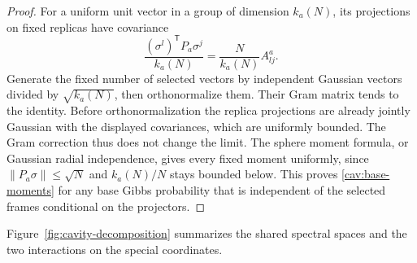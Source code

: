 \begin{proof}
For a uniform unit vector in a group of dimension $k_a(N)$, its
projections on fixed replicas have covariance
\[
 \frac{(\sigma^l)^{\mathsf T}P_a\sigma^j}{k_a(N)}
 =\frac{N}{k_a(N)}A^a_{lj}.
\]
Generate the fixed number of selected vectors by independent Gaussian
vectors divided by $\sqrt{k_a(N)}$, then orthonormalize them.  Their
Gram matrix tends to the identity.  Before orthonormalization the
replica projections are already jointly Gaussian with the displayed
covariances, which are uniformly bounded.  The Gram correction thus
does not change the limit.  The sphere moment formula, or Gaussian
radial independence, gives every fixed moment uniformly, since
$\|P_a\sigma\|\le\sqrt N$ and $k_a(N)/N$ stays bounded below.  This
proves \eqref{cav:base-moments} for any base Gibbs probability that is
independent of the selected frames conditional on the projectors.
\end{proof}

Figure~\ref{fig:cavity-decomposition} summarizes the shared spectral
spaces and the two interactions on the special coordinates.

